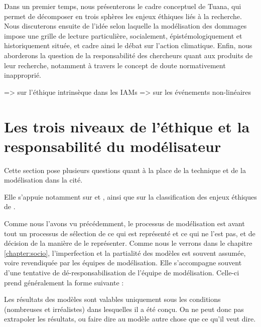 Dans un premier temps, nous présenterons le cadre conceptuel de Tuana, qui permet de décomposer en trois sphères les enjeux éthiques liés à la recherche. Nous discuterons ensuite de l'idée selon laquelle la modélisation des dommages impose une grille de lecture particulière, socialement, épistémologiquement et historiquement située, et cadre ainsi le débat sur l'action climatique. Enfin, nous aborderons la question de la responsabilité des chercheurs quant aux produits de leur recherche, notamment à travers le concept de doute normativement inapproprié. 





\cite{schienke_intrinsic_2011} => sur l'éthique intrinsèque dans les IAMs
\cite{weitzman_modeling_2009} => sur les événements non-linéaires



\section{Les trois niveaux de l'éthique et la responsabilité du modélisateur}

Cette section pose plusieurs questions quant à la place de la technique et de la modélisation dans la cité. 

Elle s'appuie notamment sur \cite{jonas_principe_2008} et \cite{edwards_vast_2013}, ainsi que sur la classification des enjeux éthiques de \cite{tuana_leading_2010}.


Comme nous l'avons vu précédemment, le processus de modélisation est avant tout un processus de sélection de ce qui est représenté et ce qui ne l'est pas, et de décision de la manière de le représenter. Comme nous le verrons dans le chapitre \ref{chapter:socio}, l'imperfection et la partialité des modèles est souvent assumée, voire revendiquée par les équipes de modélisation. Elle s'accompagne souvent d'une tentative de dé-responsabilisation de l'équipe de modélisation. Celle-ci prend généralement la forme suivante : 

\begin{authoredquote}
    Les résultats des modèles sont valables uniquement sous les conditions (nombreuses et irréalistes) dans lesquelles il a été conçu. On ne peut donc pas extrapoler les résultats, ou faire dire au modèle autre chose que ce qu'il veut dire. 
\end{authoredquote}

